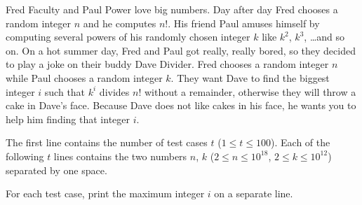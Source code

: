 Fred Faculty and Paul Power love big numbers.
Day after day Fred chooses a random integer $n$ and he computes $n!$.
His friend Paul amuses himself by computing several powers of his randomly chosen integer $k$ like $k^2$, $k^3$, \dots and so on.
On a hot summer day, Fred and Paul got really, really bored, so they decided to play a joke on their buddy Dave Divider.
Fred chooses a random integer $n$ while Paul chooses a random integer $k$.
They want Dave to find the biggest integer $i$ such that $k^i$ divides $n!$ without a remainder, otherwise they will throw a cake in Dave's face.
Because Dave does not like cakes in his face, he wants you to help him finding that integer $i$.

\begin{Input}
    The first line contains the number of test cases $t$ ($1 \leq t \leq 100$).
    Each of the following $t$ lines contains the two numbers $n$, $k$ ($2 \leq n \leq 10^{18}$, $2 \leq k \leq 10^{12}$) separated by one space.
\end{Input}

\begin{Output}
    For each test case, print the maximum integer $i$ on a separate line.
\end{Output}
